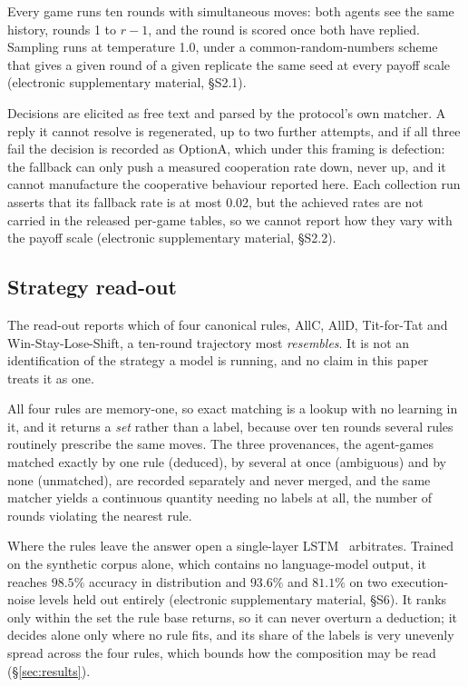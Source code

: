 \documentclass[11pt,a4paper]{article}
\begin{document}
Every game runs ten rounds with simultaneous moves: both agents see the same
history, rounds 1 to $r-1$, and the round is scored once both have replied.
Sampling runs at temperature 1.0, under a common-random-numbers scheme that
gives a given round of a given replicate the same seed at every payoff scale
(electronic supplementary material, \S S2.1).

Decisions are elicited as free text and parsed by the protocol's own matcher. A
reply it cannot resolve is regenerated, up to two further attempts, and if all
three fail the decision is recorded as OptionA, which under this framing is
defection: the fallback can only push a measured cooperation rate down, never
up, and it cannot manufacture the cooperative behaviour reported here. Each
collection run asserts that its fallback rate is at most 0.02, but the achieved
rates are not carried in the released per-game tables, so we cannot report how
they vary with the payoff scale (electronic supplementary material, \S S2.2).

\subsection{Strategy read-out}
\label{sec:readout}

The read-out reports which of four canonical rules, AllC, AllD, Tit-for-Tat and
Win-Stay-Lose-Shift, a ten-round trajectory most \emph{resembles}. It is not an
identification of the strategy a model is running, and no claim in this paper
treats it as one.

All four rules are memory-one, so exact matching is a lookup with no learning in
it, and it returns a \emph{set} rather than a label, because over ten rounds
several rules routinely prescribe the same moves. The three provenances, the
agent-games matched exactly by one rule (deduced), by several at once
(ambiguous) and by none (unmatched), are recorded separately and never merged,
and the same matcher yields a continuous quantity needing no labels at all, the
number of rounds violating the nearest rule.

Where the rules leave the answer open a single-layer
LSTM~\citep{hochreiter1997long} arbitrates. Trained on the synthetic corpus
alone, which contains no language-model output, it reaches $98.5\%$ accuracy in
distribution and $93.6\%$ and $81.1\%$ on two execution-noise levels held out
entirely (electronic supplementary material, \S S6). It ranks only within the
set the rule base returns, so it can never overturn a deduction; it decides
alone only where no rule fits, and its share of the labels is very unevenly
spread across the four rules, which bounds how the composition may be read
(\S\ref{sec:results}).
\end{document}
